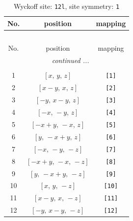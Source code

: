 \documentclass[fleqn,8pt]{jsarticle}
\begin{document}
\begin{longtable}{ccc}
\caption{Wyckoff site: {\tt 12l}, site symmetry: {\tt 1}}
 \\
 \hline \hline
No. & position & mapping \\ \hline \endfirsthead

\multicolumn{2}{l}{\tablename\ \thetable{}} \\
 \hline \hline
No. & position & mapping \\ \hline \endhead

 \hline \hline
\multicolumn{2}{r}{\footnotesize\it continued ...} \\ \endfoot

 \hline \hline
\multicolumn{2}{r}{} \\ \endlastfoot

1 & $\left[ x,\, y,\, z \right]$ & {\tt [1]} \\ \hline
2 & $\left[ x - y,\, x,\, z \right]$ & {\tt [2]} \\ \hline
3 & $\left[ - y,\, x - y,\, z \right]$ & {\tt [3]} \\ \hline
4 & $\left[ - x,\, - y,\, z \right]$ & {\tt [4]} \\ \hline
5 & $\left[ - x + y,\, - x,\, z \right]$ & {\tt [5]} \\ \hline
6 & $\left[ y,\, - x + y,\, z \right]$ & {\tt [6]} \\ \hline
7 & $\left[ - x,\, - y,\, - z \right]$ & {\tt [7]} \\ \hline
8 & $\left[ - x + y,\, - x,\, - z \right]$ & {\tt [8]} \\ \hline
9 & $\left[ y,\, - x + y,\, - z \right]$ & {\tt [9]} \\ \hline
10 & $\left[ x,\, y,\, - z \right]$ & {\tt [10]} \\ \hline
11 & $\left[ x - y,\, x,\, - z \right]$ & {\tt [11]} \\ \hline
12 & $\left[ - y,\, x - y,\, - z \right]$ & {\tt [12]} \\
\end{longtable}
\end{document}
